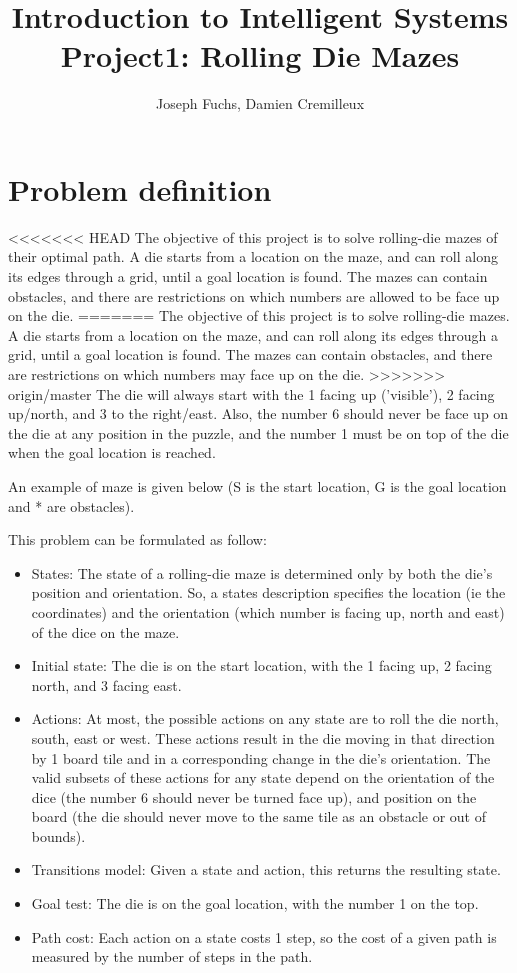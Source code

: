 \documentclass[]{article}
\title{Introduction to Intelligent Systems \\ Project1: Rolling Die Mazes}
\author{Joseph Fuchs, Damien Cremilleux}
\begin{document}
\maketitle

\section{Problem definition}
<<<<<<< HEAD
The objective of this project is to solve rolling-die mazes of their optimal path.
A die starts from a location on the maze, and can roll along its edges through a grid, until a goal location is found.
The mazes can contain obstacles, and there are restrictions on which numbers are allowed to be face up on the die.
=======
The objective of this project is to solve rolling-die mazes.
A die starts from a location on the maze, and can roll along its edges through a grid, until a goal location is found.
The mazes can contain obstacles, and there are restrictions on which numbers may face up on the die.
>>>>>>> origin/master
The die will always start with the 1 facing up ('visible'), 2 facing up/north, and 3 to the right/east.
Also, the number 6 should never be face up on the die at any position in the puzzle, and the number 1 must be on top of the die when the goal location is reached.

\medskip

An example of maze is given below (S is the start location, G is the goal location and * are obstacles).



\medskip

This problem can be formulated as follow:
\begin{itemize}
\item States: The state of a rolling-die maze is determined only by both the die's position and orientation.
So, a states description specifies the location (ie the coordinates) and the orientation (which number is facing up, north and east) of the dice on the maze.
\item Initial state: The die is on the start location, with the 1 facing up, 2 facing north, and 3 facing east.
\item Actions:  At most, the possible actions on any state are to roll the die north, south, east or west.  These actions result in the die moving in that direction by 1 board tile and in a corresponding change in the die's orientation. The valid subsets of these actions for any state depend on the orientation of the dice (the number 6 should never be turned face up), and position on the board (the die should never move to the same tile as an obstacle or out of bounds).
\item Transitions model: Given a state and action, this returns the resulting state.
\item Goal test: The die is on the goal location, with the number 1 on the top.
\item Path cost: Each action on a state costs 1 step, so the cost of a given path is measured by the number of steps in the path.
\end{itemize}
\end{document}
